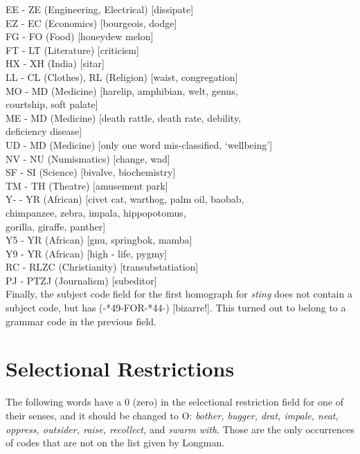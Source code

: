 \noindent
EE - ZE (Engineering, Electrical)      [dissipate] \\
EZ - EC (Economics)       [bourgeois, dodge] \\
FG - FO (Food)            [honeydew melon] \\
FT - LT (Literature)      [criticism] \\
HX - XH (India)           [sitar] \\
LL - CL (Clothes), RL (Religion) [waist, congregation] \\
MO - MD (Medicine)        [harelip, amphibian, welt, genus,  \\
                           courtship, soft palate] \\
ME - MD (Medicine)        [death rattle, death rate, debility, \\
                           deficiency disease] \\
UD - MD (Medicine) [only one word mis-classified, `wellbeing'] \\
NV - NU (Numismatics)     [change, wad] \\
SF - SI (Science)         [bivalve, biochemistry] \\
TM - TH (Theatre)         [amusement park] \\
Y- - YR (African)         [civet cat, warthog, palm oil, baobab, \\
                           chimpanzee, zebra, impala, hippopotomus, \\
                           gorilla, giraffe, panther] \\
Y5 - YR (African)         [gnu, springbok, mamba] \\
Y9 - YR (African)         [high - life, pygmy] \\

\noindent
RC - RLZC (Christianity)  [transubstatiation] \\
PJ - PTZJ (Journalism)    [subeditor] \\


Finally, the subject code field for the first homograph for {\it sting}
does not contain a subject code, but has (-*49-FOR-*44-)  [bizarre!].
This turned out to belong to a grammar code in the previous field.





\section{Selectional Restrictions}
The following words have a 0 (zero) in the selectional restriction field for 
one of their senses, and it should be changed to O: {\it bother, bugger,
drat, impale, neat, oppress, outsider, raise, recollect,} and {\it swarm
with}.  Those are the only occurrences of codes that are not on the
list given by Longman.





